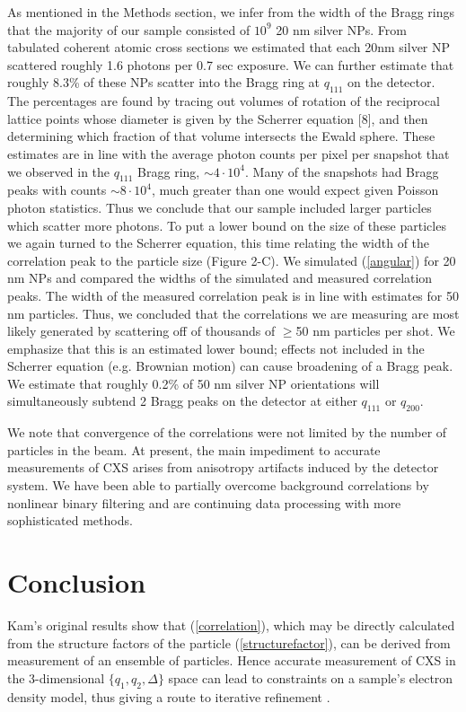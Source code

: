 \documentclass [11pt,fleqn]{article}
\begin{document}
As mentioned in the Methods section, we infer from the width of the Bragg rings that the majority of our sample consisted of $10^9$ 20 nm silver NPs. From tabulated coherent atomic cross sections \cite{Henke:1993wx} we estimated that each 20nm silver NP scattered roughly 1.6 photons per 0.7 sec exposure. We can further estimate that roughly 8.3\% of these NPs scatter into the Bragg ring at $q_{111}$ on the detector. The percentages are found by tracing out volumes of rotation of the reciprocal lattice points whose diameter is given by the Scherrer equation [8], and then determining which fraction of that volume intersects the Ewald sphere. These estimates are in line with the average photon counts per pixel per snapshot that we observed in the $q_{111}$ Bragg ring, $\sim 4 \cdot10^4$. Many of the snapshots had Bragg peaks with counts $\sim 8 \cdot10^4$, much greater than one would expect given Poisson photon statistics. Thus we conclude that our sample included larger particles which scatter more photons. To put a lower bound on the size of these particles we again turned to the Scherrer equation, this time relating the width of the correlation peak to the particle size (Figure 2-C). We simulated (\ref{angular}) for 20 nm NPs and compared the widths of the simulated and measured correlation peaks. The width of the measured correlation peak is in line with estimates for 50 nm particles. Thus, we concluded that the correlations we are measuring are most likely generated by scattering off of thousands of $\ge$50 nm particles per shot. We emphasize that this is an estimated lower bound; effects not included in the Scherrer equation (e.g. Brownian motion) can cause broadening of a Bragg peak. We estimate that roughly 0.2\% of 50 nm silver NP orientations will simultaneously subtend 2 Bragg peaks on the detector at either $q_{111}$ or $q_{200}$.

We note that convergence of the correlations were not limited by the number of particles in the beam.  At present, the main impediment to accurate measurements of CXS arises from anisotropy artifacts induced by the detector system.  We have been able to partially overcome background correlations by nonlinear binary filtering and are continuing data processing with more sophisticated methods.

\section{Conclusion}

Kam's original results \cite{Kam:1977wc} show that (\ref{correlation}), which may be directly calculated from the structure factors of the particle (\ref{structurefactor}), can be derived from measurement of an ensemble of particles. Hence accurate measurement of CXS in the 3-dimensional $\{q_1,q_2,\Delta\}$ space can lead to constraints on a sample's electron density model, thus giving a route to iterative refinement \cite{Schroder:2010cm}. 
\end{document}
